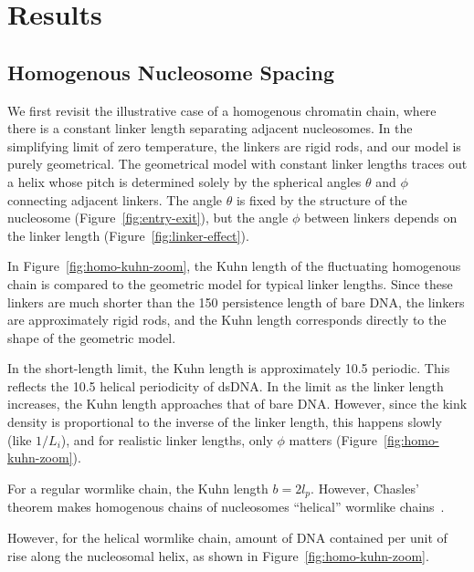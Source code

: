 \documentclass[%
 reprint,
superscriptaddress,
showpacs,preprintnumbers,
 amsmath,amssymb,
 aps,
 prl,
]{revtex4-1}
\newcommand{\RR}{\left\langle{}R^2\right\rangle{}}
\begin{document}
\section{\label{sec:results}Results}
\subsection{\label{sec:homo-kuhn}Homogenous Nucleosome Spacing}

We first revisit the illustrative case of a homogenous chromatin chain, where
    there is a constant linker length separating adjacent nucleosomes.
In the simplifying limit of zero temperature, the linkers are rigid rods, and
    our model is purely geometrical.
The geometrical model with constant linker lengths traces out a helix whose
    pitch is determined solely by the spherical angles $\theta$ and $\phi$
    connecting adjacent linkers.
The angle $\theta$ is fixed by the structure of the nucleosome
    (Figure~\ref{fig:entry-exit}), but the angle $\phi$ between linkers depends
    on the linker length (Figure~\ref{fig:linker-effect}).

In Figure~\ref{fig:homo-kuhn-zoom}, the Kuhn length of the
    fluctuating homogenous chain is compared to the geometric model for
    typical linker lengths.
Since these linkers are much shorter than the \SI{150}{\basepair} persistence
    length of bare DNA, the linkers are approximately rigid rods, and the Kuhn
    length corresponds directly to the shape of the geometric model.

In the short-length limit, the Kuhn length is approximately \SI{10.5}{\basepair}
    periodic.
This reflects the \SI{10.5}{\basepair} helical periodicity of dsDNA.\@
In the limit as the linker length increases, the Kuhn length approaches that of
    bare DNA.\@
However, since the kink density is proportional to the inverse of the linker
    length, this happens slowly (like $1/L_i$), and for realistic linker
    lengths, only $\phi$ matters (Figure~\ref{fig:homo-kuhn-zoom}).

For a regular wormlike chain, the Kuhn length $b = 2 l_p$.
However, Chasles' theorem makes homogenous chains of nucleosomes ``helical''
    wormlike chains~\cite{yamakawa2016}.

However, for the helical wormlike chain,
    amount of DNA contained per unit of rise along the nucleosomal helix,
    as shown in Figure~\ref{fig:homo-kuhn-zoom}.
\end{document}
